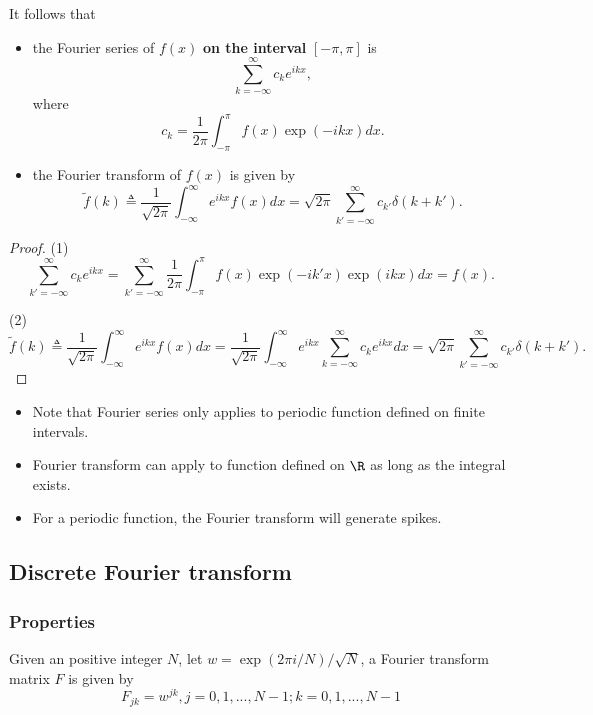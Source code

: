 \begin{refsection}
\begin{lemma}
	It follows that
	\begin{itemize}
		\item the Fourier series of $f(x)$ \textbf{on the interval} $[-\pi,\pi]$ is
		$$\sum_{k=-\infty}^{\infty} c_k e^{ikx},$$
		where 
		$$c_k = \frac{1}{2\pi} \int_{-\pi}^{\pi} f(x)\exp(-ikx)dx .$$
		\item the Fourier transform of $f(x)$ is given by
		$$\tilde{f}(k) \triangleq \frac{1}{\sqrt{2\pi}} \int_{-\infty}^{\infty} e^{ikx} f(x)dx = \sqrt{2\pi} \sum_{k'=-\infty}^\infty c_{k'}\delta(k+k').$$
	\end{itemize}
\end{lemma}
\begin{proof}
	(1) 
	$$\sum_{k'=-\infty}^\infty c_k e^{ikx} = \sum_{k'=-\infty}^\infty \frac{1}{2\pi} \int_{-\pi}^{\pi} f(x)\exp(-ik'x)\exp(ikx) dx  = f(x). $$
	
	(2)	
	$$\tilde{f}(k) \triangleq \frac{1}{\sqrt{2\pi}} \int_{-\infty}^{\infty} e^{ikx} f(x)dx  =  \frac{1}{\sqrt{2\pi}} \int_{-\infty}^{\infty} e^{ikx}  \sum_{k=-\infty}^{\infty} c_k e^{ikx} dx = \sqrt{2\pi} \sum_{k'=-\infty}^\infty c_{k'}\delta(k+k').$$
\end{proof}

\begin{remark}\hfill
	\begin{itemize}
		\item Note that Fourier series only applies to periodic function defined on finite intervals.
		\item Fourier transform can apply to function defined on $\R$ as long as the integral exists. 
		\item For a periodic function, the Fourier transform will generate spikes. 
	\end{itemize}
\end{remark}



\subsection{Discrete Fourier transform}
\subsubsection{Properties}
\begin{definition}
	Given an positive integer $N$, let $w = \exp(2\pi i/N)/\sqrt{N}$, a Fourier transform matrix $F$ is given by $$F_{jk} = w^{jk}, j =0,1,...,N-1; k=0,1,...,N-1$$
\end{definition}



\end{refsection}
